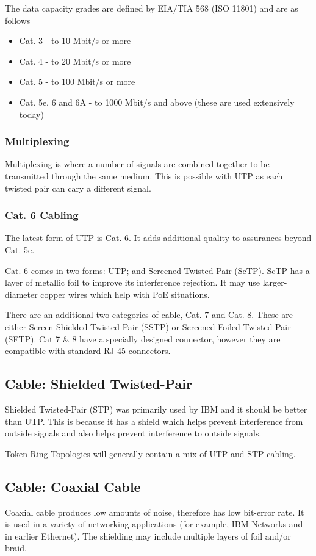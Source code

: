 The data capacity grades are defined by EIA/TIA 568 (ISO 11801) and are as follows
\begin{itemize}
    \item Cat. 3 - to 10 Mbit/s or more
    \item Cat. 4 - to 20 Mbit/s or more
    \item Cat. 5 - to 100 Mbit/s or more
    \item Cat. 5e, 6 and 6A  - to 1000 Mbit/s and above (these are used extensively today)
\end{itemize}

\subsubsection*{Multiplexing}
Multiplexing is where a number of signals are combined together to be transmitted through the same medium. This is possible with UTP as each twisted pair can cary a different signal.

\subsubsection*{Cat. 6 Cabling}
The latest form of UTP is Cat. 6. It adds additional quality to assurances beyond Cat. 5e.

Cat. 6 comes in two forms: UTP; and Screened Twisted Pair (ScTP). ScTP has a layer of metallic foil to improve its interference rejection. It may use larger-diameter copper wires which help with PoE situations. 

There are an additional two categories of cable, Cat. 7 and Cat. 8. These are either Screen Shielded Twisted Pair (SSTP) or Screened Foiled Twisted Pair (SFTP). Cat 7 \& 8 have a specially designed connector, however they are compatible with standard RJ-45 connectors.

\subsection*{Cable: Shielded Twisted-Pair}
Shielded Twisted-Pair (STP) was primarily used by IBM and it should be better than UTP. This is because it has a shield which helps prevent interference from outside signals and also helps prevent interference to outside signals.

Token Ring Topologies will generally contain a mix of UTP and STP cabling.

\subsection*{Cable: Coaxial Cable}
Coaxial cable produces low amounts of noise, therefore has low bit-error rate. It is used in a variety of networking applications (for example, IBM Networks and in earlier Ethernet). The shielding may include multiple layers of foil and/or braid. 

